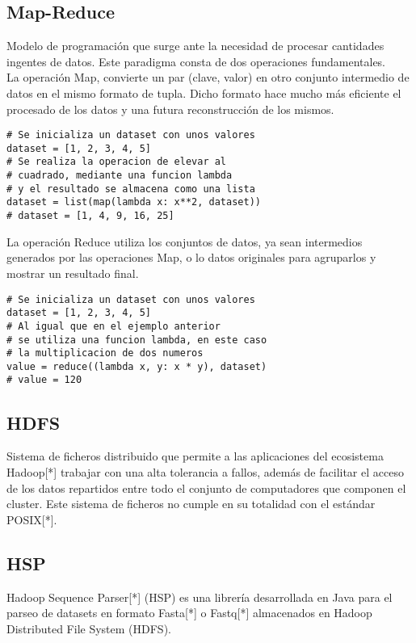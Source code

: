 \documentclass[conference]{IEEEtran}
\begin{document}
\subsection{Map-Reduce}
Modelo de programación que surge ante la necesidad de procesar cantidades ingentes de datos. Este paradigma consta de dos operaciones fundamentales.\\

La operación Map, convierte un par (clave, valor) en otro conjunto intermedio de datos en el mismo formato de tupla. Dicho formato hace mucho más eficiente el procesado de los datos y una futura reconstrucción de los mismos.\\

\begin{lstlisting}[caption=Ejemplo de código Map]
# Se inicializa un dataset con unos valores
dataset = [1, 2, 3, 4, 5]
# Se realiza la operacion de elevar al 
# cuadrado, mediante una funcion lambda
# y el resultado se almacena como una lista
dataset = list(map(lambda x: x**2, dataset))
# dataset = [1, 4, 9, 16, 25]
\end{lstlisting}

La operación Reduce utiliza los conjuntos de datos, ya sean intermedios generados por las operaciones Map, o lo datos originales para agruparlos y mostrar un resultado final.

\begin{lstlisting}[caption=Ejemplo de código Reduce]
# Se inicializa un dataset con unos valores
dataset = [1, 2, 3, 4, 5]
# Al igual que en el ejemplo anterior 
# se utiliza una funcion lambda, en este caso
# la multiplicacion de dos numeros
value = reduce((lambda x, y: x * y), dataset)
# value = 120
\end{lstlisting}

\subsection{HDFS}
Sistema de ficheros distribuido que permite a las aplicaciones del ecosistema Hadoop[*] trabajar con una alta tolerancia a fallos, además de facilitar el acceso de los datos repartidos entre todo el conjunto de computadores que componen el cluster. Este sistema de ficheros no cumple en su totalidad con el estándar POSIX[*].

\subsection{HSP}
Hadoop Sequence Parser[*] (HSP) es una librería desarrollada en Java para el parseo de datasets en formato Fasta[*] o Fastq[*] almacenados en Hadoop Distributed File System (HDFS).
\end{document}
